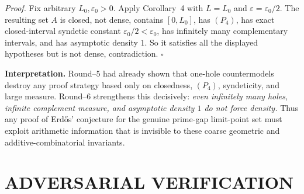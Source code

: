 \medskip
\noindent\emph{Proof.}
Fix arbitrary $L_0,\varepsilon_0>0$.
Apply Corollary~4 with $L=L_0$ and $\varepsilon=\varepsilon_0/2$.
The resulting set $A$ is closed, not dense, contains $[0,L_0]$, has $(P_4)$, has exact closed-interval syndetic constant $\varepsilon_0/2<\varepsilon_0$, has infinitely many complementary intervals, and has asymptotic density $1$.
So it satisfies all the displayed hypotheses but is not dense, contradiction.
\hfill$\square$

\medskip
\noindent\textbf{Interpretation.}
Round--5 had already shown that one-hole countermodels destroy any proof strategy based only on closedness, $(P_4)$, syndeticity, and large measure. Round--6 strengthens this decisively:
\emph{even infinitely many holes, infinite complement measure, and asymptotic density $1$ do not force density.}
Thus any proof of Erd\H{o}s' conjecture for the genuine prime-gap limit-point set must exploit arithmetic information that is invisible to these coarse geometric and additive-combinatorial invariants.


\section{ADVERSARIAL VERIFICATION}

